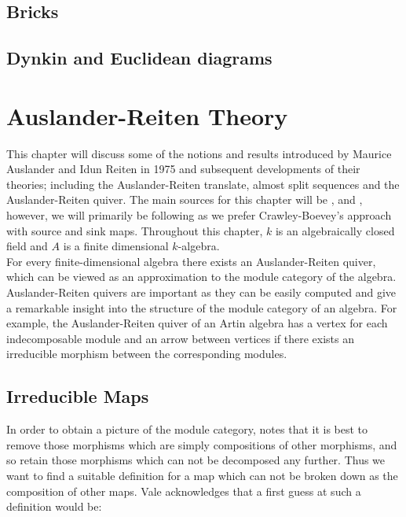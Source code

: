 \documentclass[11.5pt, twoside, a4paper, titlepage]{report}
\theoremstyle{definition}
\theoremstyle{plain}
\begin{document}
\section{Bricks}

\section{Dynkin and Euclidean diagrams}





\chapter{Auslander-Reiten Theory}
This chapter will discuss some of the notions and results introduced by Maurice Auslander and Idun Reiten in 1975 and subsequent developments of their theories; including the Auslander-Reiten translate, almost split sequences and the Auslander-Reiten quiver. The main sources for this chapter will be \cite{CB3}, \cite{Vale} and \cite{Assem}, however, we will primarily be following \cite{CB3} as we prefer Crawley-Boevey's approach with source and sink maps. Throughout this chapter, $k$ is an algebraically closed field and $A$ is a finite dimensional $k$-algebra.\\
For every finite-dimensional algebra there exists an Auslander-Reiten quiver, which can be viewed as an approximation to the module category of the algebra. Auslander-Reiten quivers are important as they can be easily computed and give a remarkable insight into the structure of the module category of an algebra. For example, the Auslander-Reiten quiver of an Artin algebra has a vertex for each indecomposable module and an arrow between vertices if there exists an irreducible morphism between the corresponding modules. \cite{AR}

\section{Irreducible Maps}
In order to obtain a picture of the module category, \cite{Vale} notes that it is best to remove those morphisms which are simply compositions of other morphisms, and so retain those morphisms which can not be decomposed any further. Thus we want to find a suitable definition for a map which can not be broken down as the composition of other maps. Vale acknowledges that a first guess at such a definition would be:
\end{document}
